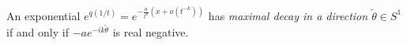 \begin{comment}
  \begin{defn}
    \marginnote{\cite[130]{hotta2008}, \cite[79]{Loday2014}}
    A function is \emph{of maximal decay}, if \PROBLEM{}
    \begin{s-rem}
      \marginnote{\cite[79]{Loday2014}}
      An exponential $e^{q(1/t)}=e^{-\frac{a}{t^{k}}(x+o(t^{-k}))}$ has maximal
      decay in a direction $\tilde\theta\in S^1$ if and only if
      $-ae^{-ik\tilde\theta}$ is real negative.
    \end{s-rem}

    \comm{On the other hand, is a function is \emph{flat}, if\dots}
  \end{defn}
\end{comment}
\begin{defn}
  An exponential $e^{q(1/t)}=e^{-\frac{a}{t^{k}}(x+o(t^{-k}))}$ has
  \emph{maximal decay in a direction $\tilde\theta\in S^1$} if and only if
  $-ae^{-ik\tilde\theta}$ is real negative.
\end{defn}


